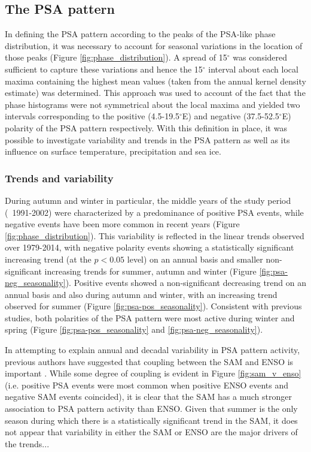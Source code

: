 \subsection{The PSA pattern}\label{s:psa_results}

In defining the PSA pattern according to the peaks of the PSA-like phase distribution, it was necessary to account for seasonal variations in the location of those peaks (Figure \ref{fig:phase_distribution}). A spread of 15$^{\circ}$ was considered sufficient to capture these variations and hence the 15$^{\circ}$ interval about each local maxima containing the highest mean values (taken from the annual kernel density estimate) was determined. This approach was used to account of the fact that the phase histograms were not symmetrical about the local maxima and yielded two intervals corresponding to the positive (4.5-19.5$^{\circ}$E) and negative (37.5-52.5$^{\circ}$E) polarity of the PSA pattern respectively. With this definition in place, it was possible to investigate variability and trends in the PSA pattern as well as its influence on surface temperature, precipitation and sea ice. 

\subsubsection{Trends and variability}

During autumn and winter in particular, the middle years of the study period (~1991-2002) were characterized by a predominance of positive PSA events, while negative events have been more common in recent years (Figure \ref{fig:phase_distribution}). This variability is reflected in the linear trends observed over 1979-2014, with negative polarity events showing a statistically significant increasing trend (at the $p < 0.05$ level) on an annual basis and smaller non-significant increasing trends for summer, autumn and winter (Figure \ref{fig:psa-neg_seasonality}). Positive events showed a non-significant decreasing trend on an annual basis and also during autumn and winter, with an increasing trend observed for summer (Figure \ref{fig:psa-pos_seasonality}). Consistent with previous studies, both polarities of the PSA pattern were most active during winter and spring (Figure \ref{fig:psa-pos_seasonality} and \ref{fig:psa-neg_seasonality}). 

In attempting to explain annual and decadal variability in PSA pattern activity, previous authors have suggested that coupling between the SAM and ENSO is important \citep[e.g.][]{Fogt2006}. While some degree of coupling is evident in Figure \ref{fig:sam_v_enso} (i.e. positive PSA events were most common when positive ENSO events and negative SAM events coincided), it is clear that the SAM has a much stronger association to PSA pattern activity than ENSO. Given that summer is the only season during which there is a statistically significant trend in the SAM, it does not appear that variability in either the SAM or ENSO are the major drivers of the trends...


